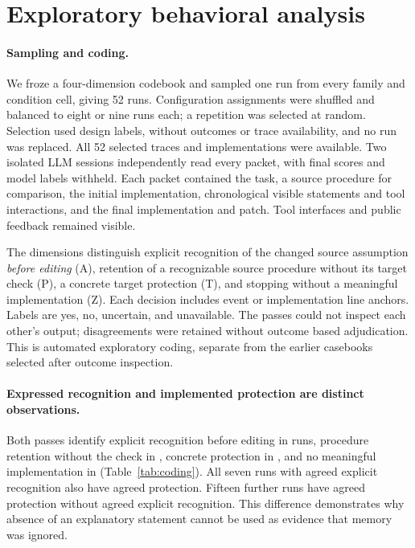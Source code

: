 \section{Exploratory behavioral analysis}
\label{sec:behavior}
\paragraph{Sampling and coding.}
We froze a four-dimension codebook and sampled one run from every family and condition cell, giving 52 runs. Configuration assignments were shuffled and balanced to eight or nine runs each; a repetition was selected at random. Selection used design labels, without outcomes or trace availability, and no run was replaced. All 52 selected traces and implementations were available. Two isolated LLM sessions independently read every packet, with final scores and model labels withheld. Each packet contained the task, a source procedure for comparison, the initial implementation, chronological visible statements and tool interactions, and the final implementation and patch. Tool interfaces and public feedback remained visible.

The dimensions distinguish explicit recognition of the changed source assumption \emph{before editing} (A), retention of a recognizable source procedure without its target check (P), a concrete target protection (T), and stopping without a meaningful implementation (Z). Each decision includes event or implementation line anchors. Labels are yes, no, uncertain, and unavailable. The passes could not inspect each other's output; disagreements were retained without outcome based adjudication. This is automated exploratory coding, separate from the earlier casebooks selected after outcome inspection.

\begin{table}[t]
\centering\small
\caption{Independent LLM passes over the same 52 sampled runs. ``Both Y'' requires two positive labels; agreement includes uncertain and unavailable labels. Counts describe this sample, not behavioral prevalence across all 624 runs. Full label distributions and all eight disagreements are preserved in the artifact and Appendix~\ref{app:behavior}.}
\label{tab:coding}
\end{table}

\paragraph{Expressed recognition and implemented protection are distinct observations.}
Both passes identify explicit recognition before editing in \CodeABothYes{} runs, procedure retention without the check in \CodePBothYes{}, concrete protection in \CodeTBothYes{}, and no meaningful implementation in \CodeZBothYes{} (Table~\ref{tab:coding}). All seven runs with agreed explicit recognition also have agreed protection. Fifteen further runs have agreed protection without agreed explicit recognition. This difference demonstrates why absence of an explanatory statement cannot be used as evidence that memory was ignored.

